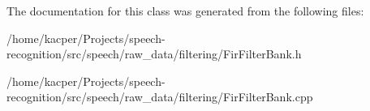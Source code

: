 The documentation for this class was generated from the following files\+:\begin{DoxyCompactItemize}
\item 
/home/kacper/\+Projects/speech-\/recognition/src/speech/raw\+\_\+data/filtering/Fir\+Filter\+Bank.\+h\item 
/home/kacper/\+Projects/speech-\/recognition/src/speech/raw\+\_\+data/filtering/Fir\+Filter\+Bank.\+cpp\end{DoxyCompactItemize}
